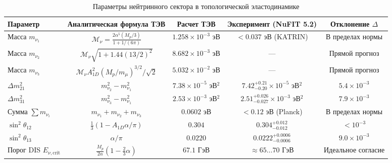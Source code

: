 \documentclass[12pt,a4paper]{article}
\theoremstyle{definition}
\theoremstyle{remark}
\begin{document}
\begin{table}[h!]
	\centering
	\small
	\caption{Параметры нейтринного сектора в топологической эластодинамике}
	\label{tab:neutrino}
	\vspace{2mm}
	\begin{tabular}{lcccc}
		\toprule
		\textbf{Параметр} & \textbf{Аналитическая формула ТЭВ} & \textbf{Расчет ТЭВ} & \textbf{Эксперимент (NuFIT 5.2)} & \textbf{Отклонение $\Delta$} \\
		\midrule
		Масса $m_{\nu_1}$              & $\mathcal{M}_\nu = \frac{2\alpha^5 (M_p/3)}{1+1/(6\pi)}$ & $1.258 \times 10^{-3}$ эВ & $< 0.037$ эВ (KATRIN) & В пределах нормы \\
		Масса $m_{\nu_2}$              & $\mathcal{M}_\nu \sqrt{1 + 1.44(13/2)^2}$                & $8.682 \times 10^{-3}$ эВ & ---                   & Прямой прогноз \\
		Масса $m_{\nu_3}$              & $\mathcal{M}_\nu A_{1D}^2 (M_p/m_\mu)^{3/2}/\sqrt{2}$    & $5.032 \times 10^{-2}$ эВ & ---                   & Прямой прогноз \\
		$\Delta m_{21}^2$              & $m_{\nu_2}^2 - m_{\nu_1}^2$                              & $7.38 \times 10^{-5}$ эВ$^2$ & $7.42_{-0.20}^{+0.21} \times 10^{-5}$ эВ$^2$ & $5.4 \times 10^{-3}$ \\
		$\Delta m_{31}^2$              & $m_{\nu_3}^2 - m_{\nu_1}^2$                              & $2.53 \times 10^{-3}$ эВ$^2$ & $2.51_{-0.027}^{+0.026} \times 10^{-3}$ эВ$^2$ & $7.9 \times 10^{-3}$ \\
		Сумма $\sum m_{\nu_i}$         & $m_{\nu_1} + m_{\nu_2} + m_{\nu_3}$                      & $0.0602$ эВ               & $< 0.12$ эВ (Planck)  & В пределах нормы \\
		$\sin^2\theta_{12}$            & $\frac{1}{3}(1 - A_{1D}\alpha/\pi)$                      & $0.304$                   & $0.304_{-0.012}^{+0.012}$ & $< 10^{-3}$ \\
		$\sin^2\theta_{13}$            & $\alpha/\pi$                                             & $0.0220$                  & $0.0222_{-0.0006}^{+0.0006}$ & $9.0 \times 10^{-3}$ \\
		Порог DIS $E_{\nu,\mathrm{crit}}$ & $\frac{M_p}{2\alpha}(1 - \frac{2}{3}\alpha)$           & $67.1$ ГэВ                & $\approx 65\dots 70$ ГэВ & Идеальное согласие \\
		\bottomrule
	\end{tabular}
\end{table}

\end{document}
